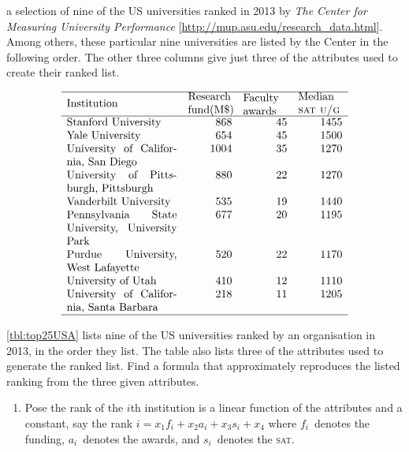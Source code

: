 \begin{exercise} \label{ex:top25USA} 
\begin{table}
\caption{a selection of nine of the US universities ranked in 2013 by \emph{The Center for Measuring University Performance} [\url{http://mup.asu.edu/research_data.html}].  
Among others, these particular nine universities are listed by the Center in the following order.  
The other three columns give just three of the attributes used to create their ranked list.}
\label{tbl:top25USA}
\begin{equation*}
\begin{array}{p{10em}rrr}
\hline
Institution& 
\parbox{4em}{\raggedright Research fund(M\$)}& 
\parbox{4em}{\raggedright Faculty awards} & 
\parbox{4em}{\raggedright Median \textsc{sat u/g}}\\
\hline
Stanford University&868&45&1455\\
Yale University&654&45&1500\\
University of California, San Diego&1004&35&1270\\
University of Pittsburgh, Pittsburgh&880&22&1270\\
Vanderbilt University&535&19&1440\\
Pennsylvania State University, University Park&677&20&1195\\
Purdue University, West Lafayette&520&22&1170\\
University of Utah&410&12&1110\\
University of California, Santa Barbara&218&11&1205\\
\hline
\end{array}
\end{equation*}
\end{table}%
\autoref{tbl:top25USA} lists nine of the US universities ranked by an organisation in 2013, in the order they list.
The table also lists three of the attributes used to generate the ranked list.
Find a formula that approximately reproduces the listed ranking from the three given attributes.
\begin{enumerate}
\item Pose the rank of the \(i\)th institution is a linear function of the attributes and a constant, say the rank \(i=x_1f_i+x_2a_i+x_3s_i+x_4\) where \(f_i\)~denotes the funding, \(a_i\)~denotes the awards, and \(s_i\)~denotes the \textsc{sat}.

\end{enumerate}
\end{exercise}
